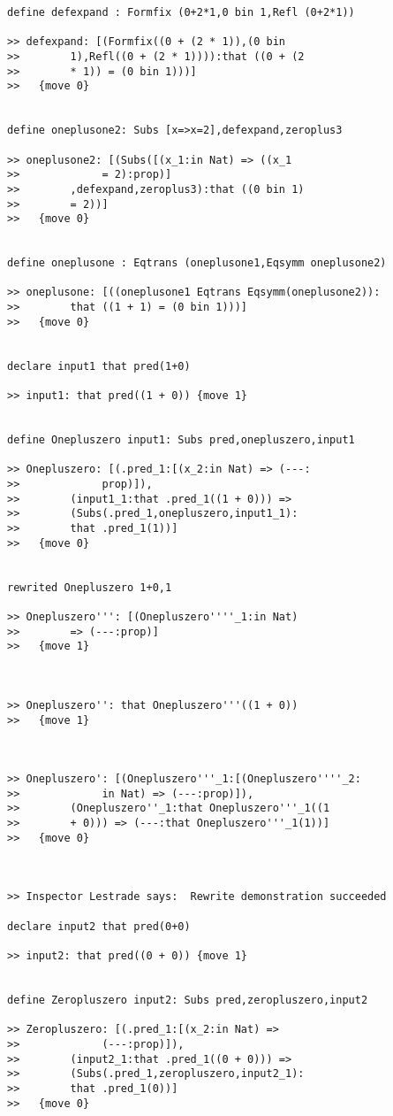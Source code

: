 \documentclass{article}
\begin{document}
\begin{verbatim}
define defexpand : Formfix (0+2*1,0 bin 1,Refl (0+2*1))

>> defexpand: [(Formfix((0 + (2 * 1)),(0 bin 
>>        1),Refl((0 + (2 * 1)))):that ((0 + (2 
>>        * 1)) = (0 bin 1)))]
>>   {move 0}


define oneplusone2: Subs [x=>x=2],defexpand,zeroplus3

>> oneplusone2: [(Subs([(x_1:in Nat) => ((x_1 
>>             = 2):prop)]
>>        ,defexpand,zeroplus3):that ((0 bin 1) 
>>        = 2))]
>>   {move 0}


define oneplusone : Eqtrans (oneplusone1,Eqsymm oneplusone2)

>> oneplusone: [((oneplusone1 Eqtrans Eqsymm(oneplusone2)):
>>        that ((1 + 1) = (0 bin 1)))]
>>   {move 0}


declare input1 that pred(1+0)

>> input1: that pred((1 + 0)) {move 1}


define Onepluszero input1: Subs pred,onepluszero,input1

>> Onepluszero: [(.pred_1:[(x_2:in Nat) => (---:
>>             prop)]),
>>        (input1_1:that .pred_1((1 + 0))) => 
>>        (Subs(.pred_1,onepluszero,input1_1):
>>        that .pred_1(1))]
>>   {move 0}


rewrited Onepluszero 1+0,1

>> Onepluszero''': [(Onepluszero''''_1:in Nat) 
>>        => (---:prop)]
>>   {move 1}



>> Onepluszero'': that Onepluszero'''((1 + 0)) 
>>   {move 1}



>> Onepluszero': [(Onepluszero'''_1:[(Onepluszero''''_2:
>>             in Nat) => (---:prop)]),
>>        (Onepluszero''_1:that Onepluszero'''_1((1 
>>        + 0))) => (---:that Onepluszero'''_1(1))]
>>   {move 0}



>> Inspector Lestrade says:  Rewrite demonstration succeeded

declare input2 that pred(0+0)

>> input2: that pred((0 + 0)) {move 1}


define Zeropluszero input2: Subs pred,zeropluszero,input2

>> Zeropluszero: [(.pred_1:[(x_2:in Nat) => 
>>             (---:prop)]),
>>        (input2_1:that .pred_1((0 + 0))) => 
>>        (Subs(.pred_1,zeropluszero,input2_1):
>>        that .pred_1(0))]
>>   {move 0}



\end{verbatim}
\end{document}
